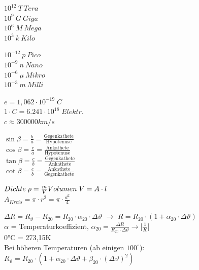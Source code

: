 \begin{minipage}{2.7cm}
	$10^{12} \: T \:Tera$ \\
	$10^9 \: G \: Giga$ \\
	$10^6 \: M \: Mega$ \\
	$10^3 \: k \: Kilo$ \\
\end{minipage}
\begin{minipage}{2.7cm}
	$10^{-12} \: p \:Pico$ \\
	$10^{-9} \: n \: Nano$ \\
	$10^{-6} \: \mu \: Mikro$ \\ 
	$10^{-3} \: m \: Milli$ \\
\end{minipage}
\begin{minipage}{4.5cm}
	$e = 1,062 \cdot 10^{-19} \; C$ \\
	$1\cdot C = 6.241\cdot 10^{18} \; Elektr.$ \\
	$c \approx 300000 km/s$ \\
\end{minipage}
\begin{minipage}{4cm}
	$\sin \beta = \frac ba =\frac{\text{Gegenkathete}}{\text{Hypotenuse}}$\\
	$\cos \beta = \frac ca =\frac{\text{Ankathete}}{\text{Hypotenuse}}$\\
	$\tan \beta = \frac cb =\frac{\text{Gegenkathete}}{\text{Ankathete}}$\\
	$\cot \beta = \frac cb =\frac{\text{Ankathete}}{\text{Gegenkathete}}$\\
\end{minipage}
\begin{minipage}{4cm}
	$Dichte \; \rho = \frac{m}{V} \\
	Volumen \; V = A \cdot l$ \\
	$A_{Kreis} = \pi \cdot r^2 = \pi \cdot \frac{d^2}{4}$ \\
\end{minipage}
$\Delta R = R_{\vartheta}-R_{20} = R_{20} \cdot \alpha_{20} \cdot \Delta \vartheta$ $\rightarrow$ $R = R_{20} \cdot (1 + \alpha_{20} \cdot \Delta \vartheta)$\\
$\alpha$ = Temperaturkoeffizient, $\alpha_{20}=\frac{\Delta R}{ R_{20} \cdot \Delta \vartheta} \rightarrow \lbrack \frac{1}{K} \rbrack$\\
0°C = 273,15K \\
Bei höheren Temperaturen (ab einigen $100^\circ$): \\
$R_{\vartheta} = R_{20} \cdot\left( 1 + \alpha_{20} \cdot \Delta \vartheta + \beta_{20} \cdot (\Delta \vartheta)^2 \right)$

